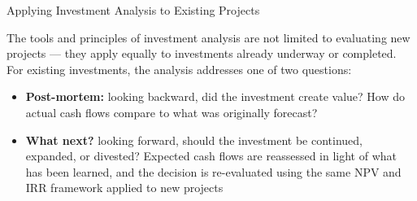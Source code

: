 \documentclass[10pt]{article}
\begin{document}
    \begin{core}{Applying Investment Analysis to Existing Projects}

      The tools and principles of investment analysis are not limited to evaluating new projects — they apply equally to investments already underway or completed. For existing investments, the analysis addresses one of two questions:

      \begin{itemize}

        \item \textbf{Post-mortem:} looking backward, did the investment create value? How do actual cash flows compare to what was originally forecast?

        \item \textbf{What next?} looking forward, should the investment be continued, expanded, or divested? Expected cash flows are reassessed in light of what has been learned, and the decision is re-evaluated using the same NPV and IRR framework applied to new projects

      \end{itemize}


    \end{core}
\end{document}
